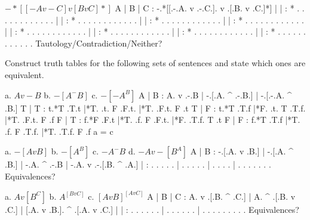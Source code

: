 $ -*[[-A v -C] v [B v C]*] $
	\answer
	\truthtable
	 A | B | C :  -.*[[.-.A. v .-.C.]. v .[.B. v .C.]*]
	\truthtableline
	   |   |   : * .   . . .   . . . .   . . .   . 
	   |   |   : * .   . . .   . . . .   . . .   . 
	   |   |   : * .   . . .   . . . .   . . .   . 
	   |   |   : * .   . . .   . . . .   . . .   . 
	   |   |   : * .   . . .   . . . .   . . .   . 
	   |   |   : * .   . . .   . . . .   . . .   . 
	   |   |   : * .   . . .   . . . .   . . .   . 
	   |   |   : * .   . . .   . . . .   . . .   . 
	\endtruthtable
	Tautology/Contradiction/Neither?
	\endanswer

\endproblems

Construct truth tables for the following sets of sentences and state which ones are equivalent.

\problems
{}
\list
a. $ A v -B $
b. $ -[A ^ -B] $
c. $ -[-A ^ B] $
\endlist
	\answer
	\truthtable
	 A | B : A. v .-.B | -.[.A. ^ .-.B.] | -.[.-.A. ^ .B.]
	\truthtableline
	 T | T : t.*T .T.t |*T. .t. F .F.t.  |*T. .F.t. F .t
	 T | F : t.*T .T.f |*F. .t. T .T.f.  |*T. .F.t. F .f
	 F | T : f.*F .F.t |*T. .f. F .F.t.  |*F. .T.f. T .t
	 F | F : f.*T .T.f |*T. .f. F .T.f.  |*T. .T.f. F .f
	\endtruthtable
	a = c
	\endanswer

\list
a. $ -[A v B] $
b. $ -[A ^ B] $
c. $ -A ^ -B $
d. $ -A v -[B ^ A] $
\endlist
	\answer
	\truthtable
	 A | B : -.[.A. v .B.] | -.[.A. ^ .B.] | -.A. ^ .-.B | -.A. v .-.[.B. ^ .A.]
	\truthtableline
	   |   :  . . .   . .  |  . . .   . .  |  . .   . .  |  . .   . . . .   . 
	\endtruthtable
	Equivalences?
	\endanswer

\list
a. $ A v [B ^ C] $
b. $ A ^ [B v C] $
c. $ [A v B] ^ [A v C] $
\endlist
	\answer
	\truthtable
	 A | B | C : A. v .[.B. ^ .C.] | A. ^ .[.B. v .C.] | [.A. v .B.]. ^ .[.A. v .C.]
	\truthtableline
	   |   |   :  .   . . .   . .  |  .   . . .   . .  |  . .   . . .   . . .   . 
	\endtruthtable
	Equivalences?
	\endanswer

\endproblems
\bye
